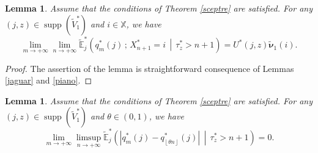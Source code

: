 \documentclass[12pt]{amsart}
\newtheorem{lemma}[theorem]{Lemma}
\theoremstyle{definition}
\numberwithin{equation}{section}
\newcommand*{\abs}[1]{\left\lvert#1\right\rvert}
\newcommand*{\pent}[1]{\left\lfloor#1\right\rfloor}
\newcommand*{\sachant}[2]{\left.#1 \,\middle|\,#2\right.}
\def\bb#1{\mathbb{#1}}
\def\tt#1{\tilde{#1}}
\def\tbs#1{\tilde{\boldsymbol{#1}}}
\def\tbb#1{\tilde{\mathbb{#1}}}
\DeclareMathOperator{\supp}{supp}
\begin{document}
\begin{lemma} Assume that the conditions of Theorem \ref{sceptre} are satisfied.
\label{recreation}
For any $(j,z) \in \supp(\tt V_1^*)$ and $i \in \bb X$, we have
\[
\lim_{m\to+\infty} \lim_{n\to +\infty} \tbb E_j^* \left( \sachant{ q_m^*(j) \,;\, X_{n+1}^* = i }{ \tau_z^* > n+1 } \right) = U^*(j,z) \tbs \nu_1 (i).
\]
\end{lemma}
\begin{proof}
The assertion of the lemma is straightforward consequence of  Lemmas \ref{jaguar} and \ref{piano}.
\end{proof}



\begin{lemma} Assume that the conditions of Theorem \ref{sceptre} are satisfied.
\label{castorBP}
For any $(j,z) \in \supp(\tt V_1^*)$ and $\theta \in (0,1)$, we have
\[
\lim_{m\to+\infty} \limsup_{n\to +\infty} \tbb E_j^* \left( \sachant{ \abs{q_m^*(j)-q_{\pent{\theta n}}^*(j)} }{ \tau_z^* > n+1 } \right) = 0.
\]
\end{lemma}
\end{document}
